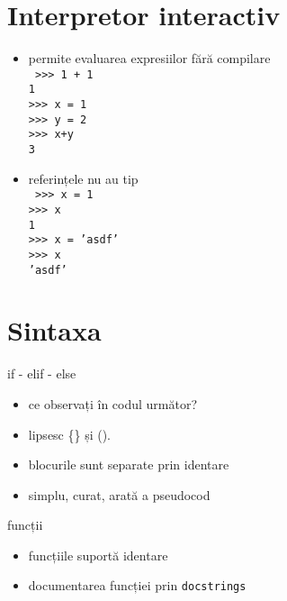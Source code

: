 \documentclass{beamer}
\begin{document}
\section{Interpretor interactiv}
\frame{\tableofcontents[currentsection]}


\begin{frame}{}
  \begin{itemize}
  \item permite evaluarea expresiilor fără compilare \\
    \texttt{
      >>> 1 + 1 \\ 
      1         \\
      >>> x = 1 \\ 
      >>> y = 2 \\ 
      >>> x+y   \\
      3
    }
  \item referințele nu au tip\\
    \texttt{
      >>> x = 1        \\
      >>> x            \\
      1                \\
      >>> x = 'asdf'   \\
      >>> x            \\
      'asdf'
    }

  \end{itemize}
\end{frame}



\section{Sintaxa}
\frame{\tableofcontents[currentsection]}

\begin{frame}{if - elif - else}
  \begin{itemize}[<+->]
  \item ce observați în codul următor? \\
    
  \item lipsesc \{\} și ().
  \item blocurile sunt separate prin identare
  \item simplu, curat, arată a pseudocod
  \end{itemize}
\end{frame}

\begin{frame}{funcții}
  \begin{itemize}[<+->]
  \item funcțiile suportă identare \\
    
  \item documentarea funcției prin \texttt{docstrings}
  \end{itemize}
\end{frame}
\end{document}

